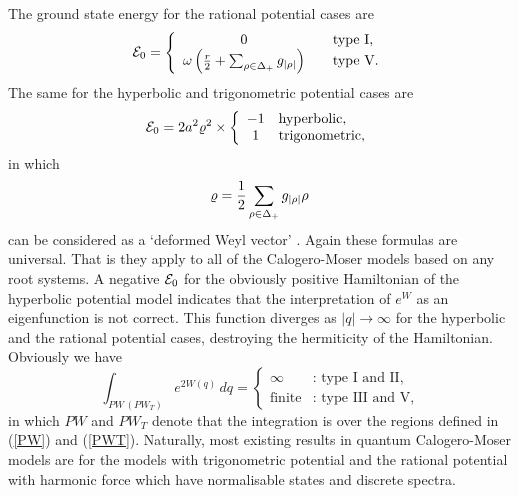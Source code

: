 \documentclass[a4paper,12pt]{article}
\begin{document}
The ground state energy for the rational potential cases are
\begin{equation}
   {\cal E}_0= \left\{
   \begin{array}{cll}
      0&&\mbox{type I},\\
      \omega\left({r\over2}+\sum_{\rho\in\Delta_+}g_{|\rho|}\right)&&
      \mbox{type V}.
   \end{array}
   \right.
\end{equation}
The same for the hyperbolic  and trigonometric  potential cases are
\begin{equation}
   {\cal E}_0=
   {2a^2}\varrho^2
   \times
   \left\{
   \begin{array}{cl}
      -1&\mbox{hyperbolic},\\
      1&\mbox{trigonometric},
   \end{array}
   \right.
   \label{e0fom}
\end{equation}
in which
\begin{equation}
   \varrho ={1\over2}\sum_{\rho\in\Delta_+}g_{|\rho|}\rho
\end{equation}
can be considered as a `deformed Weyl vector' \cite{OP2,HeOp}.
Again these formulas are universal. That is they apply to all of the
Calogero-Moser models based on any root systems.
A negative \({\cal E}_0\) for the obviously positive Hamiltonian of the
hyperbolic potential model indicates that the interpretation of \(e^W\)
as an eigenfunction is not correct. This function diverges as
\(|q|\to\infty\) for the hyperbolic and the rational
potential cases, destroying the hermiticity of the Hamiltonian.
 Obviously we have
\begin{equation}
   \int_{PW\,(PW_T)}e^{2W(q)}\,dq=\left\{
   \begin{array}{cl}
      \infty&\mbox{: type I and II},\\
      \mbox{finite}&\mbox{: type III and V},
   \end{array}
   \right.
\end{equation}
in which \(PW\) and \(PW_T\) denote that the integration is over the regions
defined in (\ref{PW}) and (\ref{PWT}).
Naturally,  most existing results in quantum Calogero-Moser models are
for the models with trigonometric potential and the
rational potential with harmonic force which have  normalisable states
and discrete spectra.
\end{document}
